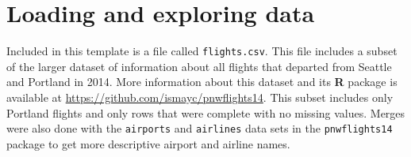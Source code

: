 \documentclass[12pt,twoside]{reedthesis}
\begin{document}
\hypertarget{loading-and-exploring-data}{%
\section{Loading and exploring data}\label{loading-and-exploring-data}}

Included in this template is a file called \texttt{flights.csv}. This file includes a subset of the larger dataset of information about all flights that departed from Seattle and Portland in 2014. More information about this dataset and its \textbf{R} package is available at \url{https://github.com/ismayc/pnwflights14}. This subset includes only Portland flights and only rows that were complete with no missing values. Merges were also done with the \texttt{airports} and \texttt{airlines} data sets in the \texttt{pnwflights14} package to get more descriptive airport and airline names.
\end{document}
